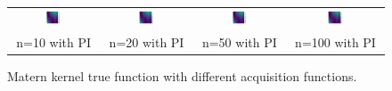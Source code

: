 \documentclass[11pt]{article}
\begin{document}
\begin{figure}[H]
\begin{tabular}{cccc}
        \includegraphics[width=0.225\textwidth]{../Task-02/plots/true_function_matern_n10_PI.png} &
        \includegraphics[width=0.225\textwidth]{../Task-02/plots/true_function_matern_n20_PI.png} &
        \includegraphics[width=0.225\textwidth]{../Task-02/plots/true_function_matern_n50_PI.png} &
        \includegraphics[width=0.225\textwidth]{../Task-02/plots/true_function_matern_n100_PI.png} \\
        n=10 with PI & n=20 with PI & n=50 with PI & n=100 with PI \\
    \end{tabular}
    \caption{Matern kernel true function with different acquisition functions.}
    \label{fig:matern_true_function}
\end{figure}
\end{document}
